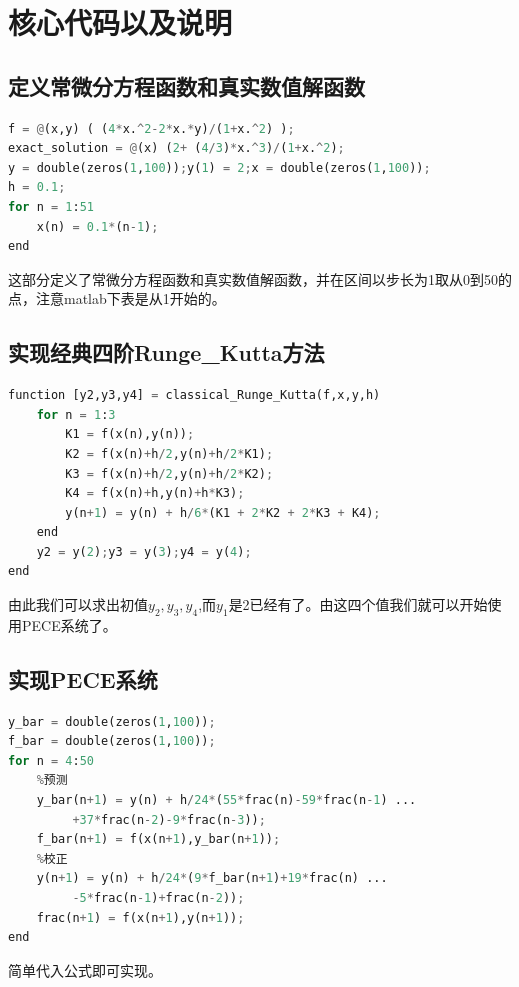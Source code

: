 \documentclass{LabReport}
\begin{document}
	\section{核心代码以及说明}
	\subsection{定义常微分方程函数和真实数值解函数}
\begin{lstlisting}[language=python,frame=shadowbox]
f = @(x,y) ( (4*x.^2-2*x.*y)/(1+x.^2) );
exact_solution = @(x) (2+ (4/3)*x.^3)/(1+x.^2);
y = double(zeros(1,100));y(1) = 2;x = double(zeros(1,100));
h = 0.1;
for n = 1:51
	x(n) = 0.1*(n-1);
end
\end{lstlisting}	
	这部分定义了常微分方程函数和真实数值解函数，并在区间以步长为1取从0到50的点，注意matlab下表是从1开始的。
	\subsection{实现经典四阶Runge\_Kutta方法}
\begin{lstlisting}[language=python,frame=shadowbox]
% 利用经典四阶Runge_Kutta方法预测y2,y3,y4的函数
function [y2,y3,y4] = classical_Runge_Kutta(f,x,y,h)
	for n = 1:3
		K1 = f(x(n),y(n));
		K2 = f(x(n)+h/2,y(n)+h/2*K1);
		K3 = f(x(n)+h/2,y(n)+h/2*K2);
		K4 = f(x(n)+h,y(n)+h*K3);
		y(n+1) = y(n) + h/6*(K1 + 2*K2 + 2*K3 + K4);
	end
	y2 = y(2);y3 = y(3);y4 = y(4);
end
\end{lstlisting}
	由此我们可以求出初值$y_2,y_3,y_4$,而$y_1$是2已经有了。由这四个值我们就可以开始使用PECE系统了。
	\subsection{实现PECE系统}
\begin{lstlisting}[language=python,frame=shadowbox]
% 省去利用经典四阶Runge_Kutta方法预测y2,y3,y4的代码，上面已经展示
y_bar = double(zeros(1,100));
f_bar = double(zeros(1,100));
for n = 4:50
    %预测
    y_bar(n+1) = y(n) + h/24*(55*frac(n)-59*frac(n-1) ...
         +37*frac(n-2)-9*frac(n-3));
    f_bar(n+1) = f(x(n+1),y_bar(n+1));
    %校正
    y(n+1) = y(n) + h/24*(9*f_bar(n+1)+19*frac(n) ...
         -5*frac(n-1)+frac(n-2));
    frac(n+1) = f(x(n+1),y(n+1));
end
\end{lstlisting}
	简单代入公式即可实现。
	
\end{document}
